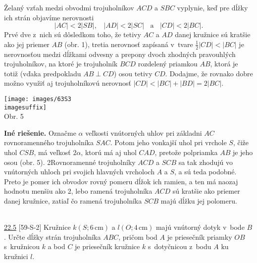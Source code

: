 \rieh Želaný vzťah medzi obvodmi trojuholníkov $ACD$ a $SBC$ vyplynie, keď pre dĺžky ich strán objavíme nerovnosti
$$|AC| < 2|SB|,\ \ \ \  |AD| < 2|SC|\ \ \ \  \text{a} \ \ \ \  |CD| < 2|BC|.$$
Prvé dve z~nich sú dôsledkom toho, že tetivy $AC$ a $AD$ danej kružnice sú kratšie ako jej priemer $AB$ (obr. 1), tretia nerovnosť zapísaná v~tvare $\frac{1}{2}|CD| < |BC|$ je nerovnosťou medzi dĺžkami odvesny a prepony dvoch zhodných pravouhlých trojuholníkov, na ktoré je trojuholník $BCD$ rozdelený priamkou $AB$, ktorá je totiž (vďaka predpokladu $AB \perp CD$) osou tetivy $CD$. Dodajme, že rovnako dobre možno využiť aj trojuholníkovú nerovnosť $|CD| < |BC| + |BD| = 2|BC|$.
\begin{center}
\texttt{[image: images/63S3\\imagesuffix]}\\

Obr. 5
\end{center}
\textbf{Iné riešenie.} Označme $\alpha$ veľkosti vnútorných uhlov pri základni $AC$ rovnoramenného trojuholníka $SAC$. Potom jeho vonkajší uhol pri vrchole $S$, čiže uhol $CSB$, má veľkosť $2\alpha$, ktorú má aj uhol $CAD$, pretože polpriamka $AB$ je jeho osou (obr. 5). 2Rovnoramenné trojuholníky $ACD$ a $SCB$ sa tak zhodujú vo vnútorných uhloch pri svojich hlavných vrcholoch $A$ a $S$, a sú teda podobné. Preto je pomer ich obvodov rovný pomeru dĺžok ich ramien, a ten má naozaj hodnotu menšiu ako 2, lebo ramená trojuholníka $ACD$ sú kratšie ako priemer danej kružnice, zatiaľ čo ramená trojuholníka $SCB$ majú dĺžku jej polomeru.\\
\\
\begin{tcolorbox}[breakable,notitle,boxrule=0pt,colback=light-gray,colframe=light-gray]\ul{22.5} [59-S-2] Kružnice $k(S; 6\,\text{cm})$ a $l(O; 4\,\text{cm})$ majú vnútorný dotyk v~bode $B$. Určte dĺžky strán trojuholníka $ABC$, pričom bod $A$ je priesečník priamky $OB$ s~kružnicou $k$ a bod $C$ je priesečník kružnice $k$ s~dotyčnicou z~bodu $A$ ku kružnici $l$.

\end{tcolorbox}

